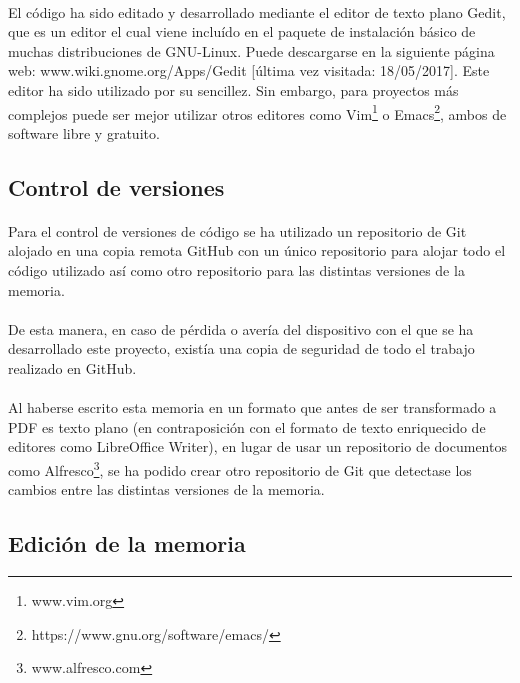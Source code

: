 \documentclass{article}
\begin{document}
\paragraph{}
El código ha sido editado y desarrollado mediante el editor de texto plano Gedit, que es un editor el cual viene incluído en el paquete de instalación básico de muchas distribuciones de GNU-Linux. Puede descargarse en la siguiente página web: www.wiki.gnome.org/Apps/Gedit [última vez visitada: 18/05/2017]. Este editor ha sido utilizado por su sencillez. Sin embargo, para proyectos más complejos puede ser mejor utilizar otros editores como Vim\footnote{www.vim.org} o Emacs\footnote{https://www.gnu.org/software/emacs/}, ambos de software libre y gratuito.

\subsection{Control de versiones}
\paragraph{}
Para el control de versiones de código se ha utilizado un repositorio de Git alojado en una copia remota GitHub con un único repositorio para alojar todo el código utilizado así como otro repositorio para las distintas versiones de la memoria.

\paragraph{}
De esta manera, en caso de pérdida o avería del dispositivo con el que se ha desarrollado este proyecto, existía una copia de seguridad de todo el trabajo realizado en GitHub.

\paragraph{}
Al haberse escrito esta memoria en un formato que antes de ser transformado a PDF es texto plano (en contraposición con el formato de texto enriquecido de editores como LibreOffice Writer), en lugar de usar un repositorio de documentos como Alfresco\footnote{www.alfresco.com}, se ha podido crear otro repositorio de Git que detectase los cambios entre las distintas versiones de la memoria.

\subsection{Edición de la memoria}
\end{document}
